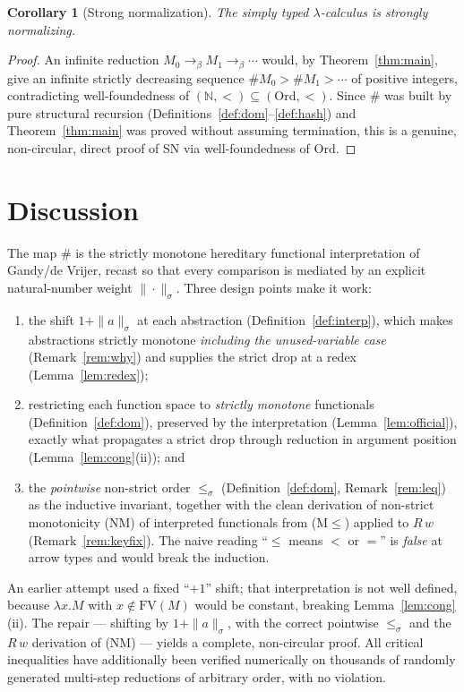 \documentclass{amsart}
\newtheorem{corollary}{Corollary}
\theoremstyle{definition}
\newcommand{\Ord}{\mathrm{Ord}}
\newcommand{\To}{\to_\beta}
\newcommand{\FV}{\mathrm{FV}}
\begin{document}
\begin{corollary}[Strong normalization]\label{cor:SN}
The simply typed $\lambda$-calculus is strongly normalizing.
\end{corollary}

\begin{proof}
An infinite reduction $M_0\To M_1\To\cdots$ would, by Theorem~\ref{thm:main}, give an
infinite strictly decreasing sequence $\#M_0>\#M_1>\cdots$ of positive integers,
contradicting well-foundedness of $(\mathbb N,<)\subseteq(\Ord,<)$. Since $\#$ was built by
pure structural recursion (Definitions~\ref{def:dom}--\ref{def:hash}) and
Theorem~\ref{thm:main} was proved without assuming termination, this is a genuine,
non-circular, direct proof of SN via well-foundedness of $\Ord$.
\end{proof}

\section*{Discussion}

The map $\#$ is the strictly monotone hereditary functional interpretation of
Gandy/de Vrijer, recast so that every comparison is mediated by an explicit natural-number
weight $\|\cdot\|_\sigma$. Three design points make it work:
\begin{enumerate}
\item the shift $1+\|a\|_\sigma$ at each abstraction (Definition~\ref{def:interp}), which
  makes abstractions strictly monotone \emph{including the unused-variable case}
  (Remark~\ref{rem:why}) and supplies the strict drop at a redex (Lemma~\ref{lem:redex});
\item restricting each function space to \emph{strictly monotone} functionals
  (Definition~\ref{def:dom}), preserved by the interpretation (Lemma~\ref{lem:official}),
  exactly what propagates a strict drop through reduction in argument position
  (Lemma~\ref{lem:cong}(ii)); and
\item the \emph{pointwise} non-strict order $\le_\sigma$ (Definition~\ref{def:dom},
  Remark~\ref{rem:leq}) as the inductive invariant, together with the clean derivation of
  non-strict monotonicity (NM) of interpreted functionals from (M$\le$) applied to $R\,w$
  (Remark~\ref{rem:keyfix}). The naive reading ``$\le$ means $<$ or $=$'' is \emph{false}
  at arrow types and would break the induction.
\end{enumerate}
An earlier attempt used a fixed ``$+1$'' shift; that interpretation is not well defined,
because $\lambda x.M$ with $x\notin\FV(M)$ would be constant, breaking
Lemma~\ref{lem:cong}(ii). The repair --- shifting by $1+\|a\|_\sigma$, with the correct
pointwise $\le_\sigma$ and the $R\,w$ derivation of (NM) --- yields a complete, non-circular
proof. All critical inequalities have additionally been verified numerically on thousands of
randomly generated multi-step reductions of arbitrary order, with no violation.
\end{document}
